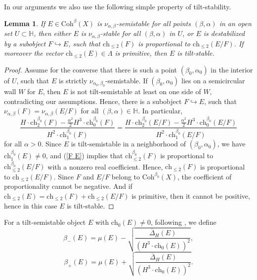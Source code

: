 \documentclass{amsart}
\newtheorem{lemma}[theorem]{Lemma}
\begin{document}
	In our arguments we also use the following simple property of tilt-stability.
	
	\begin{lemma}\label{tilt-stable}If $E\in\mathrm{Coh}^\beta(X)$ is $\nu_{\alpha,\beta}$-semistable for all points $(\beta,\alpha)$ in an open set $U\subset\mathbb H$, then either $E$ is $\nu_{\alpha,\beta}$-stable for all $(\beta,\alpha)$ in $U$, or $E$ is destabilized by a subobject $F\hookrightarrow E$, such that $\mathrm{ch}_{\le 2}(F)$ is proportional to $\mathrm{ch}_{\le 2}(E/F)$. If moreover the vector $\mathrm{ch}_{\le 2}(E)\in\Lambda$ is primitive, then $E$ is tilt-stable.
	\end{lemma}
	
	\begin{proof} Assume for the converse that there is such a point $(\beta_0,\alpha_0)$ in the interior of $U$, such that $E$ is strictly $\nu_{\alpha_0,\beta_0}$-semistable. If $(\beta_0,\alpha_0)$ lies on a semicircular wall $W$ for $E$, then $E$ is not tilt-semistable at least on one side of $W$, contradicting our assumptions. Hence, there is a subobject $F\hookrightarrow E$, such that $\nu_{\alpha,\beta}(F)=\nu_{\alpha,\beta}(E/F)$ for all $(\beta,\alpha)\in\mathbb H$. In particular,
	\begin{equation}\label{F E}\frac{H\cdot\mathrm{ch}_2^{\beta_0}(F)-\frac{\alpha^2}{2}H^3\cdot\mathrm{ch}_0^{\beta_0}(F)}{H^2\cdot\mathrm{ch}_1^{\beta_0}(F)}=\frac{H\cdot\mathrm{ch}_2^{\beta_0}(E/F)-\frac{\alpha^2}{2}H^3\cdot\mathrm{ch}_0^{\beta_0}(E/F)}{H^2\cdot\mathrm{ch}_1^{\beta_0}(E/F)}\end{equation}
	for all $\alpha>0$. Since $E$ is tilt-semistable in a neighborhood of $(\beta_0,\alpha_0)$, we have $\mathrm{ch}_1^{\beta_0}(E)\neq 0$, and (\ref{F E}) implies that $\mathrm{ch}_{\le 2}^{\beta_0}(F)$ is proportional to $\mathrm{ch}_{\le 2}^{\beta_0}(E/F)$ with a nonzero real coefficient. Hence, $\mathrm{ch}_{\le 2}(F)$ is proportional to $\mathrm{ch}_{\le 2}(E/F)$. Since $F$ and $E/F$ belong to $\mathrm{Coh}^{\beta_0}(X)$, the coefficient of proportionality cannot be negative. And if $\mathrm{ch}_{\le 2}(E)=\mathrm{ch}_{\le 2}(F)+\mathrm{ch}_{\le 2}(E/F)$ is primitive, then it cannot be positive, hence in this case $E$ is tilt-stable.
	\end{proof}
	
	For a tilt-semistable object $E$ with $\mathrm{ch}_0(E)\neq 0$, following \cite{BMSZ}, we define
	$$\beta_-(E)=\mu(E)-\sqrt{\frac{\overline{\Delta}_H(E)}{(H^3\cdot\mathrm{ch}_0(E))^2}},$$
	$$\beta_+(E)=\mu(E)+\sqrt{\frac{\overline{\Delta}_H(E)}{(H^3\cdot\mathrm{ch}_0(E))^2}}.$$
	
\end{document}
